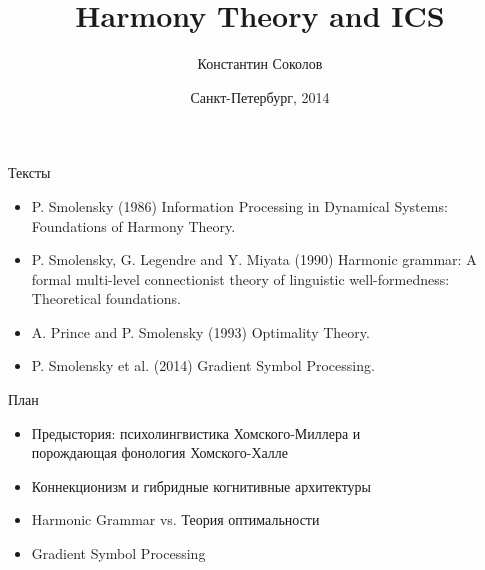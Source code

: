 \documentclass{beamer}
\begin{document}
\title{\Large{Harmony Theory and ICS}}
\author{Константин Соколов}
\date{Санкт-Петербург, 2014} 
\begin{frame}
    \thispagestyle{empty}
    \titlepage
\end{frame}

\begin{frame}{Тексты}
\setcounter{framenumber}{1}
\begin{itemize}
	\item P. Smolensky (1986) Information Processing in Dynamical Systems: Foundations of Harmony Theory.
    \medskip
    \item P. Smolensky, G. Legendre and Y. Miyata (1990) Harmonic grammar: A formal multi-level connectionist theory of linguistic well-formedness: Theoretical foundations.
    \medskip
    \item A. Prince and P. Smolensky (1993) Optimality Theory.
    \medskip
    \item P. Smolensky et al. (2014) Gradient Symbol Processing.
\end{itemize}
\end{frame}

\begin{frame}{План}
    \begin{itemize}
        \item Предыстория: психолингвистика Хомского-Миллера и \\порождающая фонология Хомского-Халле
        \medskip
        \item Коннекционизм и гибридные когнитивные архитектуры
        \medskip
        \item Harmonic Grammar vs. Теория оптимальности
        \medskip
        \item Gradient Symbol Processing
    \end{itemize}
\end{frame}

\end{document}
